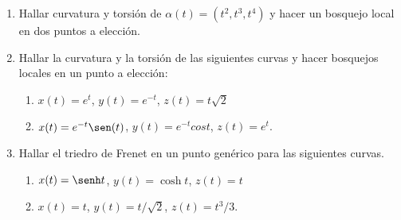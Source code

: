 \documentclass[11pt]{book}
\theoremstyle{definicion}
\theoremstyle{teorema}
\theoremstyle{ejemplo}
\begin{document}
\begin{enumerate}
\item Hallar curvatura y torsi\'on de $\alpha(t)=(t^2,t^3,t^4)$ y hacer un bosquejo local en dos puntos a elecci\'on.

\item Hallar la curvatura y la torsi\'on de las siguientes curvas y hacer bosquejos locales en un punto a elecci\'on:
\begin{enumerate}
 \item $x(t)=e^{t}$, $y(t)=e^{-t}$, $z(t)=t\sqrt{2}$
  \item $x(t)=e^{-t}\sen(t)$, $y(t)=e^{-t}cost$, $z(t)=e^{t}$.
\end{enumerate}

\item Hallar el triedro de Frenet en un punto gen\'erico para las siguientes curvas.
\begin{enumerate}
   \item      $x(t)=\senh t$, $y(t)=\cosh t$, $z(t)=t$
  \item      $x(t)=t$, $y(t)=t/\sqrt{2}$, $z(t)=t^{3}/3$.

\end{enumerate}

\end{enumerate}




\end{document}
